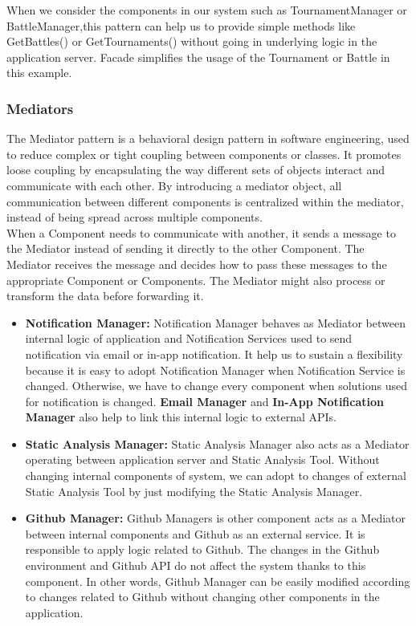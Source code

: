 When we consider the components in our system such as  TournamentManager or BattleManager,this pattern can help us to provide simple methods like GetBattles() or GetTournaments() without going in underlying logic in the application server. Facade simplifies the usage of the Tournament or Battle in this example.

\subsubsection{Mediators}
The Mediator pattern is a behavioral design pattern in software engineering, used to reduce complex or tight coupling between components or classes. It promotes loose coupling by encapsulating the way different sets of objects interact and communicate with each other. By introducing a mediator object, all communication between different components is centralized within the mediator, instead of being spread across multiple components.
\\
When a Component needs to communicate with another, it sends a message to the Mediator instead of sending it directly to the other Component.
The Mediator receives the message and decides how to pass these messages to the appropriate Component or Components.
The Mediator might also process or transform the data before forwarding it.
\begin{itemize}
    \item \textbf{Notification Manager:} Notification Manager behaves as Mediator between internal logic of application and Notification Services used to send notification via email or in-app notification. It help us to sustain a flexibility because it is easy to adopt Notification Manager when Notification Service is changed. Otherwise, we have to change every component when solutions used for notification is changed. \textbf{Email Manager} and \textbf{In-App Notification Manager} also help to link this internal logic to external APIs.
    \item \textbf{Static Analysis Manager:} Static Analysis Manager also acts as a Mediator operating between application server and Static Analysis Tool. Without changing internal components of system, we can adopt to changes of external Static Analysis Tool by just modifying the Static Analysis Manager.
    \item \textbf{Github Manager:} Github Managers is other component acts as a Mediator between internal components and Github as an external service. It is responsible to apply logic related to Github. The changes in the Github environment and Github API do not affect the system thanks to this component. In other words, Github Manager can be easily modified according to changes related to Github without changing other components in the application.
\end{itemize}




